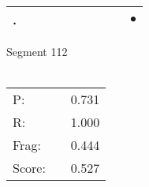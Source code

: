 \documentclass[landscape]{article}
\newcommand{\ssp}{\hspace{2pt}}
\newcommand{\mex}{\cellcolor{g}$\bullet$}
\begin{document}
\begin{tabular}{|l|p{10pt}|p{10pt}|p{10pt}|p{10pt}|p{10pt}|p{10pt}|p{10pt}|p{10pt}|p{10pt}|}
\hline
\ssp \cellcolor{ref8}. \ssp&\hspace{2pt}&\hspace{2pt}&\hspace{2pt}&\hspace{2pt}&\hspace{2pt}&\hspace{2pt}&\hspace{2pt}&\hspace{2pt}&\hspace{2pt}\mex\\
\hline
\end{tabular}

\vspace{6pt}
\noindent Segment 112\\\\
\noindent\begin{tabular}{lm{12pt}r}
\hline
P:&&0.731\\
R:&&1.000\\
Frag:&&0.444\\
Score:&&0.527\\
\end{tabular}

\newpage
\end{document}

